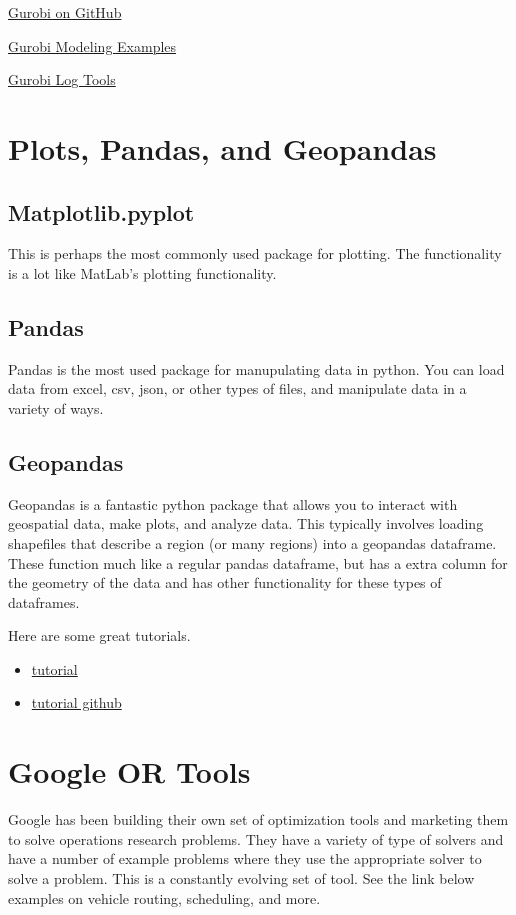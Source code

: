 \href{https://github.com/Gurobi}{Gurobi on GitHub}


\href{https://github.com/Gurobi/modeling-examples}{Gurobi Modeling Examples}

\href{https://github.com/Gurobi/grblogtools}{Gurobi Log Tools}


\section{Plots, Pandas, and Geopandas}
\todoSection{}
\subsection{Matplotlib.pyplot}
This is perhaps the most commonly used package for plotting.   The functionality is a lot like MatLab's plotting functionality.



\subsection{Pandas}
Pandas is the most used package for manupulating data in python.   You can load data from excel, csv, json, or other types of files, and manipulate data in a variety of ways.

\subsection{Geopandas}
Geopandas is a fantastic python package that allows you to interact with geospatial data, make plots, and analyze data.   This typically involves loading shapefiles that describe a region (or many regions) into a geopandas dataframe.  These function much like a regular pandas dataframe, but has a extra column for the geometry of the data and has other functionality for these types of dataframes.  

Here are some great tutorials.
\begin{itemize}
\item \href{https://jcutrer.com/python/learn-geopandas-plotting-usmaps}{tutorial}
\item \href{https://github.com/joncutrer/geopandas-tutorial}{tutorial github}
\end{itemize}
\section{Google OR Tools}
Google has been building their own set of optimization tools and marketing them to solve operations research problems.   They have a variety of type of solvers and have a number of example problems where they use the appropriate solver to solve a problem.   This is a constantly evolving set of tool. See the link below examples on vehicle routing, scheduling,  and more.  


